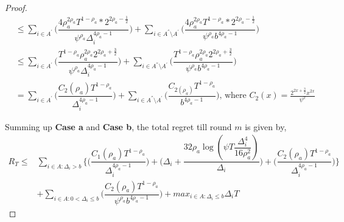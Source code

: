 \begin{proof}
\begin{align*}
&\leq\sum_{i\in A^{'}}\bigg(\dfrac{4\rho_{a}^{2\rho_{a}}T^{1-\rho_{a}}*2^{2\rho_{a}-\frac{1}{2}}}{\psi^{\rho_{a}}\Delta_{i}^{4\rho_{a}-1}} \bigg)+\sum_{i\in A^{''}\setminus A^{'}}\bigg(\dfrac{4\rho_{a}^{2\rho_{a}}T^{1-\rho_{a}}*2^{2\rho_{a}-\frac{1}{2}}}{\psi^{\rho_{a}}b^{4\rho_{a}-1}} \bigg)\\
&\leq\sum_{i\in A^{'}}\bigg(\dfrac{T^{1-\rho_{a}}\rho_{a}^{2\rho_{a}}2^{2\rho_{a}+\frac{3}{2}}}{\psi^{\rho_{a}}\Delta_{i}^{4\rho_{a}-1}} \bigg)+\sum_{i\in A^{''}\setminus A^{'}}\bigg(\dfrac{T^{1-\rho_{a}}\rho_{a}^{2\rho_{a}}2^{2\rho_{a}+\frac{3}{2}}}{\psi^{\rho_{a}}b^{4\rho_{a}-1}} \bigg)\\
& = \sum_{i\in A^{'}}\bigg(\dfrac{ C_{2}(\rho_{a}) T^{1-\rho_{a}}}{\Delta_{i}^{4\rho_{a}-1}} \bigg)+\sum_{i\in A^{''}\setminus A^{'}}\bigg(\dfrac{C_{2(\rho_{a})}T^{1-\rho_{a}}}{b^{4\rho_{a}-1}} \bigg) \text{, where } C_2(x) = \frac{2^{2x+\frac{3}{2}}x^{2x}}{\psi^{x}}
\end{align*}


 
Summing up \textbf{Case a} and \textbf{Case b}, the total regret till round $m$ is given by,
\begin{align*}
 R_{T} \leq &\sum\limits_{i\in A:\Delta_{i} > b}\bigg\lbrace\bigg(\dfrac{C_{1}(\rho_{a})T^{1-\rho_{a}}}{\Delta_{i}^{4\rho_{a}-1}}\bigg) + \bigg(\Delta_{i}+\dfrac{32\rho_{a}\log{(\psi  T\dfrac{\Delta_{i}^{4}}{16\rho_{a}^{2}})}}{\Delta_{i}}\bigg)
  +  \bigg(\dfrac{C_{2}(\rho_{a})T^{1-\rho_{a}}}{\Delta_{i}^{4\rho_{a} -1}} \bigg) \bigg \rbrace\\
  & +\sum\limits_{i\in A:0 < \Delta_{i}\leq b}\bigg(\dfrac{C_{2}(\rho_{a})T^{1-\rho_{a}}}{\psi^{\rho_{a}}b^{4\rho_{a} -1}} \bigg) + max_{i\in A:\Delta_{i}\leq b}\Delta_{i}T
\end{align*}

  
\end{proof}

